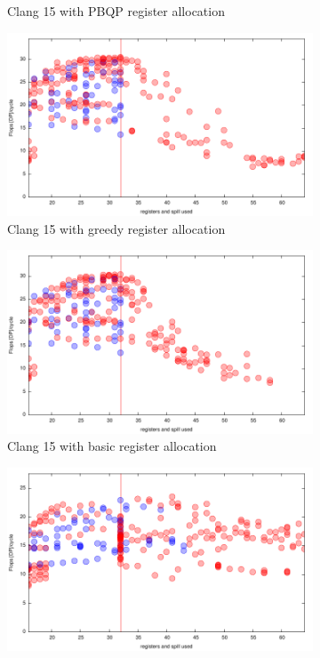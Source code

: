 \documentclass[sigconf,review]{acmart}
\begin{document}
\begin{figure}[ht]
\begin{subfigure}[h]{0.45\textwidth}
  \caption{Clang 15 with PBQP register allocation}
  \end{subfigure}
  \begin{subfigure}[h]{0.45\textwidth}  
\includegraphics[width=\textwidth]{../benches/gemm/cascadelake-64x256x64/greedy.pdf}
  \caption{Clang 15 with greedy register allocation}
  \end{subfigure}
  \begin{subfigure}[h]{0.45\textwidth}  
\includegraphics[width=\textwidth]{../benches/gemm/cascadelake-64x256x64/basic.pdf}
  \caption{Clang 15 with basic register allocation}
  \end{subfigure}
  \begin{subfigure}[h]{0.45\textwidth}  
\includegraphics[width=\textwidth]{../benches/gemm/cascadelake-64x256x64/gcc-11.9.pdf}

\end{subfigure}
\end{figure}
\end{document}
